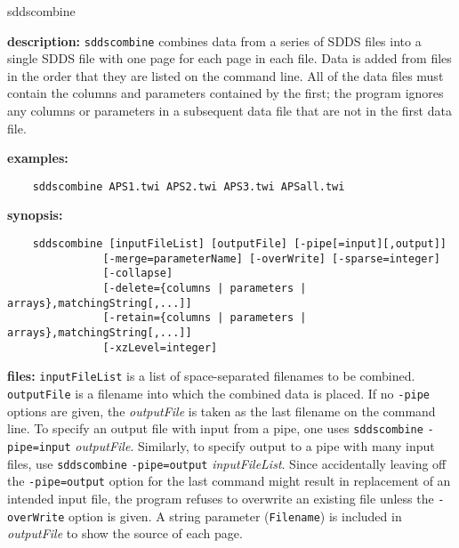 \begin{sddsprog}{sddscombine}
  \item \textbf{description:} \verb|sddscombine| combines data from a series of SDDS files into a single SDDS file with one page for each page in each file. Data is added from files in the order that they are listed on the command line. All of the data files must contain the columns and parameters contained by the first; the program ignores any columns or parameters in a subsequent data file that are not in the first data file.

  \item \textbf{examples:}
    \begin{verbatim}
    sddscombine APS1.twi APS2.twi APS3.twi APSall.twi
    \end{verbatim}

  \item \textbf{synopsis:}
    \begin{verbatim}
    sddscombine [inputFileList] [outputFile] [-pipe[=input][,output]]
               [-merge=parameterName] [-overWrite] [-sparse=integer]
               [-collapse]
               [-delete={columns | parameters | arrays},matchingString[,...]]
               [-retain={columns | parameters | arrays},matchingString[,...]]
               [-xzLevel=integer]
    \end{verbatim}

  \item \textbf{files:} \verb|inputFileList| is a list of space-separated filenames to be combined. \verb|outputFile| is a filename into which the combined data is placed. If no \verb|-pipe| options are given, the \emph{outputFile} is taken as the last filename on the command line. To specify an output file with input from a pipe, one uses \verb|sddscombine| \verb|-pipe=input| \emph{outputFile}. Similarly, to specify output to a pipe with many input files, use \verb|sddscombine| \verb|-pipe=output| \emph{inputFileList}. Since accidentally leaving off the \verb|-pipe=output| option for the last command might result in replacement of an intended input file, the program refuses to overwrite an existing file unless the \verb|-overWrite| option is given. A string parameter (\verb|Filename|) is included in \emph{outputFile} to show the source of each page.


\end{sddsprog}
